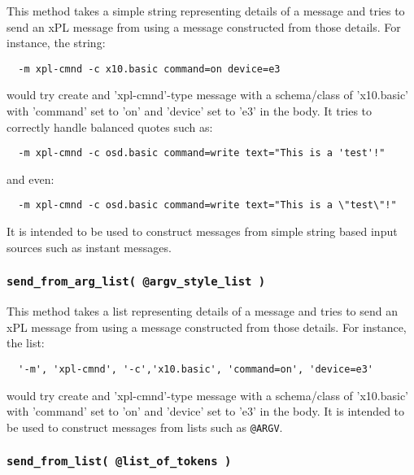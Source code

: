 This method takes a simple string representing details of a message
and tries to send an xPL message from using a message constructed
from those details.  For instance, the string:

\begin{verbatim}
  -m xpl-cmnd -c x10.basic command=on device=e3
\end{verbatim}


would try create and 'xpl-cmnd'-type message with a schema/class of
'x10.basic' with 'command' set to 'on' and 'device' set to 'e3' in the
body.  It tries to correctly handle balanced quotes such as:

\begin{verbatim}
  -m xpl-cmnd -c osd.basic command=write text="This is a 'test'!"
\end{verbatim}


and even:

\begin{verbatim}
  -m xpl-cmnd -c osd.basic command=write text="This is a \"test\"!"
\end{verbatim}


It is intended to be used to construct messages from simple string
based input sources such as instant messages.

\subsubsection*{\texttt{send\_from\_arg\_list( @argv\_style\_list )}\label{xPL::Listener_send_from_arg_list_argv_style_list_}}


This method takes a list representing details of a message
and tries to send an xPL message from using a message constructed
from those details.  For instance, the list:

\begin{verbatim}
  '-m', 'xpl-cmnd', '-c','x10.basic', 'command=on', 'device=e3'
\end{verbatim}


would try create and 'xpl-cmnd'-type message with a schema/class of
'x10.basic' with 'command' set to 'on' and 'device' set to 'e3' in the
body.  It is intended to be used to construct messages from lists
such as \texttt{@ARGV}.

\subsubsection*{\texttt{send\_from\_list( @list\_of\_tokens )}\label{xPL::Listener_send_from_list_list_of_tokens_}}


